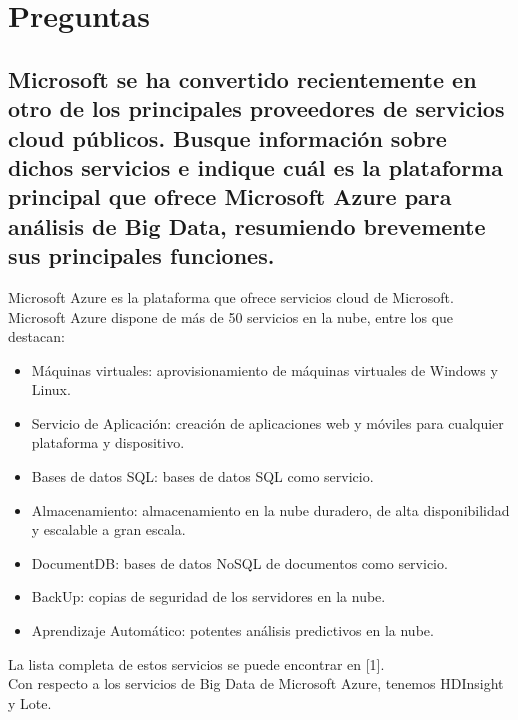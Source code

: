 \documentclass[12pt,a4paper,twoside,openright,titlepage,final]{article}
\author{José Ignacio Escribano}
\title{}
\begin{document}
\setcounter{page}{1}


\tableofcontents
\thispagestyle{empty}
\newpage

\setcounter{page}{1}


\section{Preguntas}

\subsection{Microsoft se ha convertido recientemente en otro de los principales proveedores de servicios cloud públicos. Busque información sobre dichos servicios  e indique cuál es la plataforma principal que ofrece Microsoft Azure para análisis de Big Data, resumiendo brevemente sus principales funciones.}

Microsoft Azure es la plataforma que ofrece servicios cloud de Microsoft.\\

Microsoft Azure dispone de más de 50 servicios en la nube, entre los que destacan:

\begin{itemize}
\item Máquinas virtuales: aprovisionamiento de máquinas virtuales de Windows y Linux.
\item Servicio de Aplicación: creación de aplicaciones web y móviles para cualquier plataforma y dispositivo.
\item Bases de datos SQL: bases de datos SQL como servicio.
\item Almacenamiento: almacenamiento en la nube duradero, de alta disponibilidad y escalable a gran escala.
\item DocumentDB: bases de datos NoSQL de documentos como servicio.
\item BackUp: copias de seguridad de los servidores en la nube.
\item Aprendizaje Automático: potentes análisis predictivos en la nube. 
\end{itemize}

La lista completa de estos servicios se puede encontrar en [1].\\

Con respecto a los servicios de Big Data de Microsoft Azure, tenemos HDInsight y Lote.\\
\end{document}
